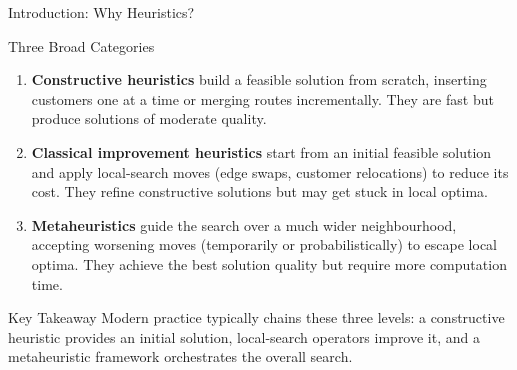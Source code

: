 \documentclass[aspectratio=169,10pt]{beamer}
\begin{document}
\begin{frame}[allowframebreaks]{Introduction: Why Heuristics?}
  \framebreak

  \begin{block}{Three Broad Categories}
    \begin{enumerate}
      \item \textbf{Constructive heuristics} build a feasible solution from
        scratch, inserting customers one at a time or merging routes
        incrementally.  They are fast but produce solutions of moderate
        quality.
      \item \textbf{Classical improvement heuristics} start from an initial
        feasible solution and apply local-search moves (edge swaps,
        customer relocations) to reduce its cost.  They refine
        constructive solutions but may get stuck in local optima.
      \item \textbf{Metaheuristics} guide the search over a much wider
        neighbourhood, accepting worsening moves (temporarily or
        probabilistically) to escape local optima.  They achieve the best
        solution quality but require more computation time.
    \end{enumerate}
  \end{block}

  \begin{alertblock}{Key Takeaway}
    Modern practice typically chains these three levels: a constructive
    heuristic provides an initial solution, local-search operators improve
    it, and a metaheuristic framework orchestrates the overall search.
  \end{alertblock}

\end{frame}
\end{document}
